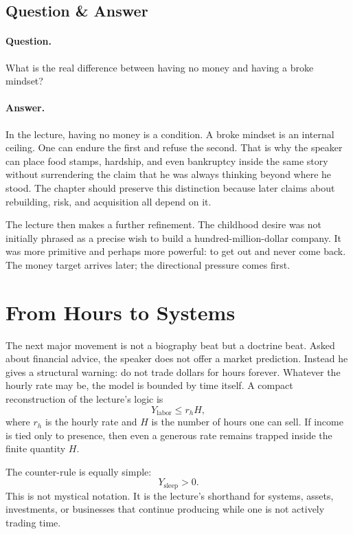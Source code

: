 \subsection{Question \& Answer}

\paragraph{Question.} What is the real difference between having no money and having a broke mindset?

\paragraph{Answer.} In the lecture, having no money is a condition. A broke mindset is an internal ceiling. One can endure the first and refuse the second. That is why the speaker can place food stamps, hardship, and even bankruptcy inside the same story without surrendering the claim that he was always thinking beyond where he stood. The chapter should preserve this distinction because later claims about rebuilding, risk, and acquisition all depend on it.

The lecture then makes a further refinement. The childhood desire was not initially phrased as a precise wish to build a hundred-million-dollar company. It was more primitive and perhaps more powerful: to get out and never come back. The money target arrives later; the directional pressure comes first.

\section{From Hours to Systems}

The next major movement is not a biography beat but a doctrine beat. Asked about financial advice, the speaker does not offer a market prediction. Instead he gives a structural warning: do not trade dollars for hours forever. Whatever the hourly rate may be, the model is bounded by time itself. A compact reconstruction of the lecture's logic is
\begin{equation}
Y_{\text{labor}} \le r_h H,
\end{equation}
where \(r_h\) is the hourly rate and \(H\) is the number of hours one can sell. If income is tied only to presence, then even a generous rate remains trapped inside the finite quantity \(H\).

The counter-rule is equally simple:
\begin{equation}
Y_{\text{sleep}} > 0.
\end{equation}
This is not mystical notation. It is the lecture's shorthand for systems, assets, investments, or businesses that continue producing while one is not actively trading time.


